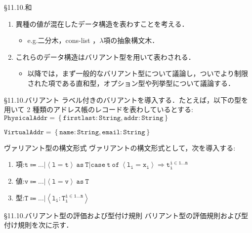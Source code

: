 \documentclass[9pt]{beamer}
\begin{document}
\begin{frame}{\S11.10.和}
\begin{enumerate}
\item 異種の値が混在したデータ構造を表わすことを考える．\begin{itemize}
\item e.g.二分木，cons-list ，$\lambda$項の抽象構文木．
\end{itemize}
\item これらのデータ構造はバリアント型を用いて表わされる．\begin{itemize}\item 以降では，まず一般的なバリアント型について議論し，ついでより制限された項である直和型，オプション型や列挙型について議論する．\end{itemize}
\end{enumerate}
\end{frame}
\begin{frame}{\S11.10.バリアント}
ラベル付きのバリアントを導入する．たとえば，以下の型を用いて 2 種類のアドレス帳のレコードを表わしているとする:
$\mathtt{PhysicalAddr = \left\{firstlast: String, addr:String\right\}}$

$\mathtt{VirtualAddr = \left\{name:String, email:String\right\}}$
\end{frame}
\begin{frame}{ヴァリアント型の構文形式}
ヴァリアントの構文形式として，次を導入する:\begin{enumerate}
\item 項:$\mathtt{t\Coloneq\ldots|\left<l = t\right>\ as\ T|case\ t\ of\ \left<l_{i}=x_{i}\right>\Rightarrow t_{i}^{i\in1\ldots n}}$
\item 値:$\mathtt{v\Coloneq\ldots|\left<l = v\right>\ as\ T}$
\item 型:$\mathtt{T\Coloneq\ldots|\left<l_{i}:T_{i}^{i\in1\ldots n}\right>}$
\end{enumerate}
\end{frame}
\begin{frame}{\S11.10.バリアント型の評価および型付け規則}
バリアント型の評価規則および型付け規則を次に示す．
\end{frame}
\end{document}
